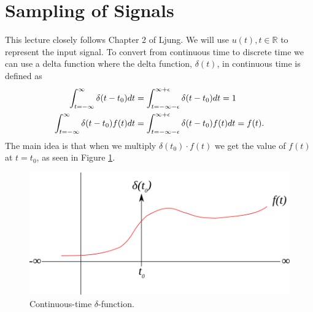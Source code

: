 
\mainmatter
\setcounter{page}{1}

\lectureseries[\course]{\course}

\date{September 29, 2009}

\setaddress

\setcounter{lecture}{1}
\setcounter{chapter}{1}


\section{Sampling of Signals}
This lecture closely follows Chapter 2 of Ljung. We will use $u(t), t \in \mathbb{R}$ to represent the input signal. To convert from continuous time to discrete time we can use a delta function where the delta function, $\delta (t)$, in continuous time is defined as
\begin{align*}
\int_{t=-\infty}^\infty \delta(t-t_0)dt &= \int_{t=-\infty-\epsilon}^{\infty+\epsilon} \delta(t-t_0)dt = 1 \\
\int_{t=-\infty}^\infty \delta(t-t_0)f(t)dt &= \int_{t=-\infty-\epsilon}^{\infty+\epsilon} \delta(t-t_0)f(t)dt = f(t).
\end{align*}
The main idea is that when we multiply $\delta(t_0) \cdot f(t)$ we get the value of $f(t)$ at $t=t_0$, as seen in Figure \ref{fig:02contDeltaFn}.
\begin{figure}[ht!]
	\centering
	\includegraphics[width=.5\textwidth]{images/02contDeltaFn}
	\caption{Continuous-time $\delta$-function.}
	\label{fig:02contDeltaFn}
\end{figure}

